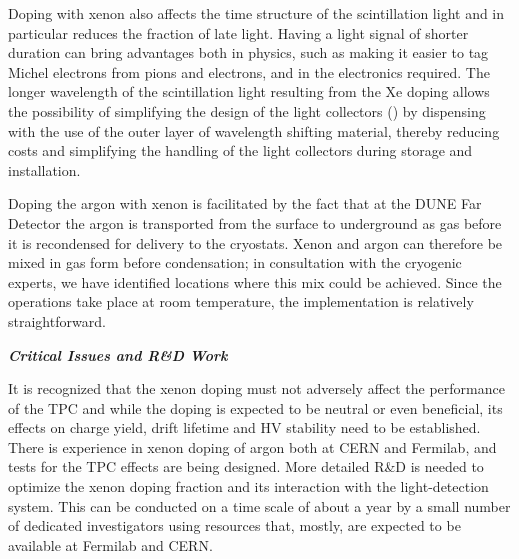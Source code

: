 Doping with xenon also affects the time structure of the scintillation light and in particular reduces the fraction of late light.  Having a light signal of shorter duration can bring advantages both in physics, such as making it easier to tag Michel electrons from pions and electrons, and in the electronics required. The longer wavelength of the scintillation light resulting from the Xe doping allows the possibility of simplifying the design of the  light collectors () by dispensing with the use of the outer layer of wavelength shifting material, thereby reducing costs and simplifying the handling of the light collectors during storage and installation. 


Doping the argon with xenon is facilitated by the fact that at the DUNE Far Detector the argon is transported from the surface to underground as gas before it is recondensed for delivery to the cryostats. Xenon and argon can therefore be mixed in gas form before condensation;  in consultation with the cryogenic experts, we have identified locations where this mix could be achieved. Since the operations take place at room temperature, the implementation is relatively straightforward.



{\it\bf Critical Issues and R\&D Work}

It is recognized that the xenon doping must not adversely affect the performance of the TPC and while the doping is expected to be neutral or even beneficial, its effects on charge yield, drift lifetime and HV stability need to be established.  There is experience in xenon doping of argon both at CERN and Fermilab, and tests for the TPC effects are being designed.  
More detailed R\&D is needed to optimize the xenon doping fraction and its interaction with the light-detection system. This can be conducted on a time scale of about a year by a small number of dedicated investigators using resources that, mostly, are expected to be available at Fermilab and CERN. 

